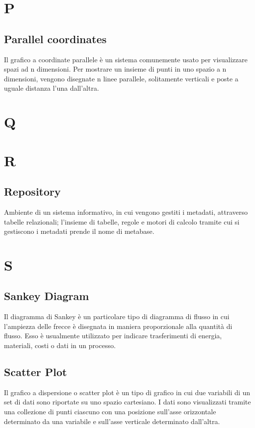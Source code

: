 \section{P}
\subsection{Parallel coordinates}
Il grafico a coordinate parallele è un sistema comunemente usato per visualizzare spazi ad n dimensioni. Per mostrare un insieme di punti in uno spazio a n dimensioni, vengono disegnate n linee parallele, solitamente verticali e poste a uguale distanza l'una dall'altra.

\section{Q}

\section{R}
\subsection{Repository}
Ambiente di un sistema informativo, in cui vengono gestiti i metadati, attraverso tabelle relazionali;
l’insieme di tabelle, regole e motori di calcolo tramite cui si gestiscono i metadati prende il nome di
metabase.

\section{S}
\subsection{Sankey Diagram}
Il diagramma di Sankey è un particolare tipo di diagramma di flusso in cui l'ampiezza delle frecce è disegnata in maniera proporzionale alla quantità di flusso.
Esso è usualmente utilizzato per indicare trasferimenti di energia, materiali, costi o dati in un processo.

\subsection{Scatter Plot}
Il grafico a dispersione o scatter plot è un tipo di grafico in cui due variabili di un set di dati sono riportate su uno spazio cartesiano.
I dati sono visualizzati tramite una collezione di punti ciascuno con una posizione sull'asse orizzontale determinato da una variabile e sull'asse verticale determinato dall'altra. 


